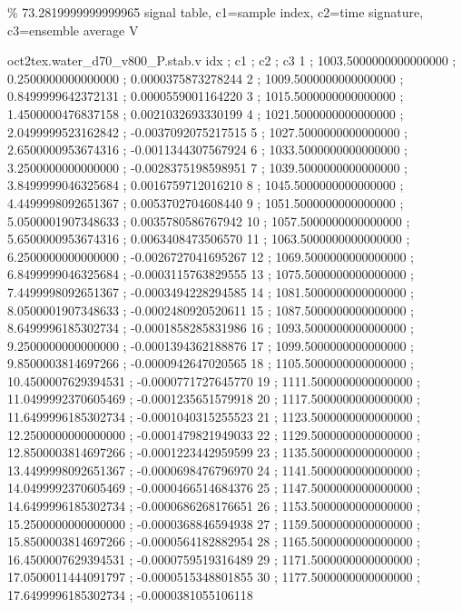 \expandafter\def\csname oct2tex.water_d70_v800_P.hub.u\endcsname{\ensuremath{\%}}
\expandafter\def\csname oct2tex.water_d70_v800_P.hub.v\endcsname{73.2819999999999965}
\expandafter\def\csname oct2tex.water_d70_v800_P.stab.d\endcsname{signal table, c1=sample index, c2=time signature, c3=ensemble average}
\expandafter\def\csname oct2tex.water_d70_v800_P.stab.u\endcsname{\ensuremath{\text{V}}}
\begin{filecontents}[overwrite]{oct2tex.water_d70_v800_P.stab.v}
idx ; c1 ; c2 ; c3
1 ; 1003.5000000000000000 ; 0.2500000000000000 ; 0.0000375873278244
2 ; 1009.5000000000000000 ; 0.8499999642372131 ; 0.0000559001164220
3 ; 1015.5000000000000000 ; 1.4500000476837158 ; 0.0021032693330199
4 ; 1021.5000000000000000 ; 2.0499999523162842 ; -0.0037092075217515
5 ; 1027.5000000000000000 ; 2.6500000953674316 ; -0.0011344307567924
6 ; 1033.5000000000000000 ; 3.2500000000000000 ; -0.0028375198598951
7 ; 1039.5000000000000000 ; 3.8499999046325684 ; 0.0016759712016210
8 ; 1045.5000000000000000 ; 4.4499998092651367 ; 0.0053702704608440
9 ; 1051.5000000000000000 ; 5.0500001907348633 ; 0.0035780586767942
10 ; 1057.5000000000000000 ; 5.6500000953674316 ; 0.0063408473506570
11 ; 1063.5000000000000000 ; 6.2500000000000000 ; -0.0026727041695267
12 ; 1069.5000000000000000 ; 6.8499999046325684 ; -0.0003115763829555
13 ; 1075.5000000000000000 ; 7.4499998092651367 ; -0.0003494228294585
14 ; 1081.5000000000000000 ; 8.0500001907348633 ; -0.0002480920520611
15 ; 1087.5000000000000000 ; 8.6499996185302734 ; -0.0001858285831986
16 ; 1093.5000000000000000 ; 9.2500000000000000 ; -0.0001394362188876
17 ; 1099.5000000000000000 ; 9.8500003814697266 ; -0.0000942647020565
18 ; 1105.5000000000000000 ; 10.4500007629394531 ; -0.0000771727645770
19 ; 1111.5000000000000000 ; 11.0499992370605469 ; -0.0001235651579918
20 ; 1117.5000000000000000 ; 11.6499996185302734 ; -0.0001040315255523
21 ; 1123.5000000000000000 ; 12.2500000000000000 ; -0.0001479821949033
22 ; 1129.5000000000000000 ; 12.8500003814697266 ; -0.0001223442959599
23 ; 1135.5000000000000000 ; 13.4499998092651367 ; -0.0000698476796970
24 ; 1141.5000000000000000 ; 14.0499992370605469 ; -0.0000466514684376
25 ; 1147.5000000000000000 ; 14.6499996185302734 ; -0.0000686268176651
26 ; 1153.5000000000000000 ; 15.2500000000000000 ; -0.0000368846594938
27 ; 1159.5000000000000000 ; 15.8500003814697266 ; -0.0000564182882954
28 ; 1165.5000000000000000 ; 16.4500007629394531 ; -0.0000759519316489
29 ; 1171.5000000000000000 ; 17.0500011444091797 ; -0.0000515348801855
30 ; 1177.5000000000000000 ; 17.6499996185302734 ; -0.0000381055106118

\end{filecontents}
